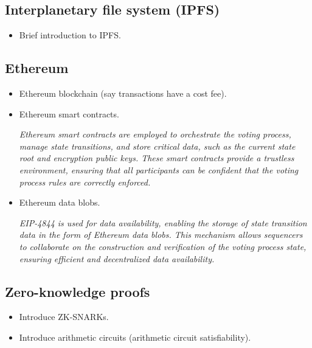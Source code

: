 
\subsection{Interplanetary file system (IPFS)}
\label{sec:background:ipfs}

\begin{itemize}
	\item Brief introduction to IPFS.
\end{itemize}

\subsection{Ethereum}
\label{sec:background:ethereum}

\begin{itemize}
	\item Ethereum blockchain (say transactions have a cost fee).
	\item Ethereum smart contracts.
	
	\textit{Ethereum smart contracts are employed to orchestrate the voting process, manage state transitions, and store critical data, such as the current state root and encryption public keys. These smart contracts provide a trustless environment, ensuring that all participants can be confident that the voting process rules are correctly enforced.}
	
	\item Ethereum data blobs.
	
	\textit{EIP-4844 is used for data availability, enabling the storage of state transition data in the form of Ethereum data blobs. This mechanism allows sequencers to collaborate on the construction and verification of the voting process state, ensuring efficient and decentralized data availability.}
	
\end{itemize}

\subsection{Zero-knowledge proofs}
\label{sec:background:zkp}

\begin{itemize}
	\item Introduce ZK-SNARKs.
	\item Introduce arithmetic circuits (arithmetic circuit satisfiability).
\end{itemize}